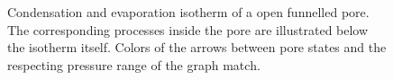 \documentclass[../../thesis.tex]{subfiles}
\begin{document}
\begin{figure}[p]
{
    \label{fig:open-funnelled-pore-evaporation}}
    \caption{Condensation \protect{} and evaporation \protect{} isotherm of a open funnelled pore. The corresponding processes inside the pore are illustrated below the isotherm itself. Colors of the arrows between pore states and the respecting pressure range of the graph match.}
    \label{fig:open-funnelled-cyl-pore-isos}
\end{figure}
\end{document}

